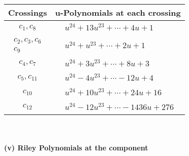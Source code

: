 \documentclass[1p]{elsarticle_modified}
\theoremstyle{definition}
\begin{document}
\begin{tabular}{m{50pt}|m{274pt}}
Crossings & \hspace{64pt}u-Polynomials at each crossing \\
\hline $$\begin{aligned}c_{1},c_{8}\end{aligned}$$&$\begin{aligned}
&u^{24}+13 u^{23}+\cdots+4 u+1
\end{aligned}$\\
\hline $$\begin{aligned}c_{2},c_{3},c_{6}\\c_{9}\end{aligned}$$&$\begin{aligned}
&u^{24}+u^{23}+\cdots+2 u+1
\end{aligned}$\\
\hline $$\begin{aligned}c_{4},c_{7}\end{aligned}$$&$\begin{aligned}
&u^{24}+3 u^{23}+\cdots+8 u+3
\end{aligned}$\\
\hline $$\begin{aligned}c_{5},c_{11}\end{aligned}$$&$\begin{aligned}
&u^{24}-4 u^{23}+\cdots-12 u+4
\end{aligned}$\\
\hline $$\begin{aligned}c_{10}\end{aligned}$$&$\begin{aligned}
&u^{24}+10 u^{23}+\cdots+24 u+16
\end{aligned}$\\
\hline $$\begin{aligned}c_{12}\end{aligned}$$&$\begin{aligned}
&u^{24}-12 u^{23}+\cdots-1436 u+276
\end{aligned}$\\
\hline
\end{tabular}\\~\\
\newpage\renewcommand{\arraystretch}{1}
\flushleft \textbf{(v) Riley Polynomials at the component}\newline \\
\end{document}
